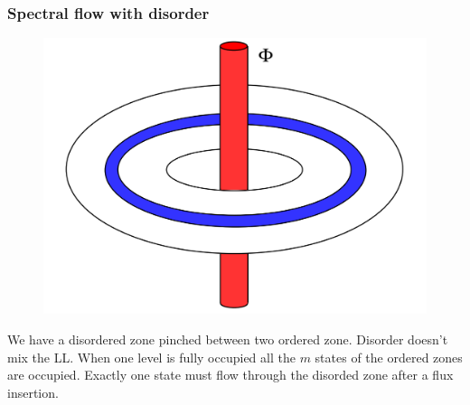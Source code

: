 \documentclass{beamer}
\begin{document}
\begin{frame}
\frametitle{Spectral flow with disorder}
\begin{center}

\begin{figure}[!htb]
\centering
\includegraphics[scale=0.20]{disorderCorbino.png}
\end{figure}

We have a disordered zone pinched between two ordered zone. Disorder doesn't mix the LL. When one level is fully occupied all the $m$ states of the ordered zones are occupied. Exactly one state must flow through the disorded zone after a flux insertion.

\end{center}
\end{frame}

\end{document}

